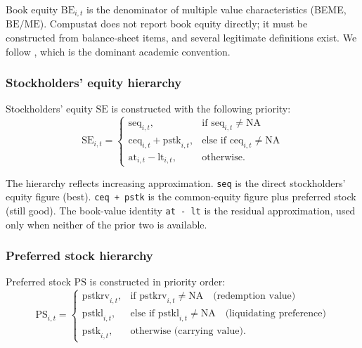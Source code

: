 Book equity \(\mathrm{BE}_{i,t}\) is the denominator of multiple value
characteristics (BEME, $\mathrm{BE}/\mathrm{ME}$). Compustat does not
report book equity directly; it must be constructed from balance-sheet
items, and several legitimate definitions exist. We follow
\cite{DavisFamaFrench2000}, which is the dominant academic convention.

\subsubsection{Stockholders' equity hierarchy}

Stockholders' equity \(\mathrm{SE}\) is constructed with the following
priority:
\begin{equation}
\mathrm{SE}_{i,t} =
\begin{cases}
\mathrm{seq}_{i,t}, & \text{if } \mathrm{seq}_{i,t} \neq \text{NA} \\
\mathrm{ceq}_{i,t} + \mathrm{pstk}_{i,t}, & \text{else if } \mathrm{ceq}_{i,t} \neq \text{NA} \\
\mathrm{at}_{i,t} - \mathrm{lt}_{i,t}, & \text{otherwise}.
\end{cases}
\label{eq:se-hierarchy}
\end{equation}

The hierarchy reflects increasing approximation. \texttt{seq} is the
direct stockholders' equity figure (best). \texttt{ceq + pstk} is the
common-equity figure plus preferred stock (still good). The book-value
identity \texttt{at - lt} is the residual approximation, used only when
neither of the prior two is available.

\subsubsection{Preferred stock hierarchy}

Preferred stock \(\mathrm{PS}\) is constructed in priority order:
\begin{equation}
\mathrm{PS}_{i,t} =
\begin{cases}
\mathrm{pstkrv}_{i,t}, & \text{if } \mathrm{pstkrv}_{i,t} \neq \text{NA}
                       \quad \text{(redemption value)}\\
\mathrm{pstkl}_{i,t}, & \text{else if } \mathrm{pstkl}_{i,t} \neq \text{NA}
                       \quad \text{(liquidating preference)}\\
\mathrm{pstk}_{i,t}, & \text{otherwise (carrying value)}.
\end{cases}
\label{eq:ps-hierarchy}
\end{equation}

